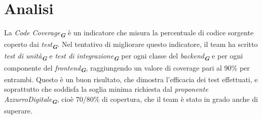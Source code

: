 \section*{Analisi}
La \emph{Code Coverage}\textsubscript{\textbf{\textit{G}}} è un indicatore che misura la percentuale di codice sorgente coperto dai \emph{test}\textsubscript{\textbf{\textit{G}}}. Nel tentativo di migliorare questo indicatore, il team ha scritto \emph{test di unità}\textsubscript{\textbf{\textit{G}}} e \emph{test di integrazione}\textsubscript{\textbf{\textit{G}}} per ogni classe del \emph{backend}\textsubscript{\textbf{\textit{G}}} e per ogni componente del \emph{frontend}\textsubscript{\textbf{\textit{G}}}, raggiungendo un valore di coverage pari al 90\% per entrambi. Questo è un buon risultato, che dimostra l'efficacia dei test effettuati, e soprattutto che soddisfa la soglia minima richiesta dal \emph{proponente} \emph{AzzurroDigitale}\textsubscript{\textbf{\textit{G}}}, cioè 70/80\% di copertura, che il team è stato in grado anche di superare.
